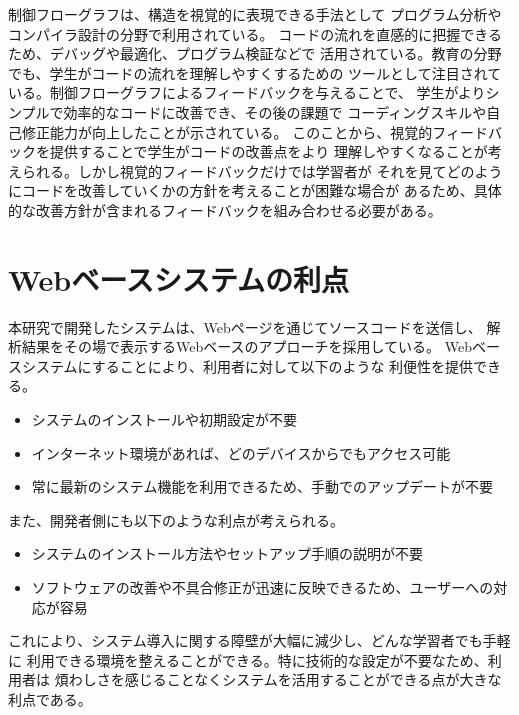 \documentclass{cssspaper}
\begin{document}
            制御フローグラフは、構造を視覚的に表現できる手法として
            プログラム分析やコンパイラ設計の分野で利用されている。
            コードの流れを直感的に把握できるため、デバッグや最適化、プログラム検証などで
            活用されている。教育の分野でも、学生がコードの流れを理解しやすくするための
            ツールとして注目されている。制御フローグラフによるフィードバックを与えることで、
            学生がよりシンプルで効率的なコードに改善でき、その後の課題で
            コーディングスキルや自己修正能力が向上したことが示されている。
            このことから、視覚的フィードバックを提供することで学生がコードの改善点をより
            理解しやすくなることが考えられる。しかし視覚的フィードバックだけでは学習者が
            それを見てどのようにコードを改善していくかの方針を考えることが困難な場合が
            あるため、具体的な改善方針が含まれるフィードバックを組み合わせる必要がある。

        \section{Webベースシステムの利点}
        本研究で開発したシステムは、Webページを通じてソースコードを送信し、
        解析結果をその場で表示するWebベースのアプローチを採用している。
        Webベースシステムにすることにより、利用者に対して以下のような
        利便性を提供できる。

        \begin{itemize}
           \item システムのインストールや初期設定が不要
           \item インターネット環境があれば、どのデバイスからでもアクセス可能
           \item 常に最新のシステム機能を利用できるため、手動でのアップデートが不要
        \end{itemize}

        また、開発者側にも以下のような利点が考えられる。

        \begin{itemize}
           \item システムのインストール方法やセットアップ手順の説明が不要
           \item ソフトウェアの改善や不具合修正が迅速に反映できるため、ユーザーへの対応が容易
        \end{itemize}

        これにより、システム導入に関する障壁が大幅に減少し、どんな学習者でも手軽に
        利用できる環境を整えることができる。特に技術的な設定が不要なため、利用者は
        煩わしさを感じることなくシステムを活用することができる点が大きな利点である。
\end{document}
